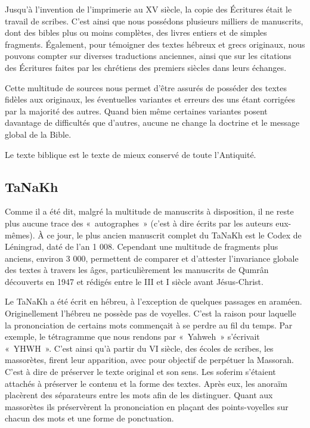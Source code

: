 \begin{small}
Jusqu'à l'invention de l'imprimerie au XV siècle, la copie des Écritures était le travail de scribes. C'est ainsi que nous possédons plusieurs milliers de manuscrits, dont des bibles plus ou moins complètes, des livres entiers et de simples fragments. Également, pour témoigner des textes hébreux et grecs originaux, nous pouvons compter sur diverses traductions anciennes, ainsi que sur les citations des Écritures faites par les chrétiens des premiers siècles dans leurs échanges.\bigskip

Cette multitude de sources nous permet d'être assurés de posséder des textes fidèles aux originaux, les éventuelles variantes et erreurs des uns étant corrigées par la majorité des autres. Quand bien même certaines variantes posent davantage de difficultés que d'autres, aucune ne change la doctrine et le message global de la Bible.\bigskip

Le texte biblique est le texte de mieux conservé de toute l'Antiquité.

\subsection*{TaNaKh}

Comme il a été dit, malgré la multitude de manuscrits à disposition, il ne reste plus aucune trace des «~autographes~» (c'est à dire écrits par les auteurs eux-mêmes). À ce jour, le plus ancien manuscrit complet du TaNaKh est le Codex de Léningrad, daté de l'an 1 008. Cependant une multitude de fragments plus anciens, environ 3 000, permettent de comparer et d'attester l'invariance globale des textes à travers les âges, particulièrement les manuscrits de Qumrân découverts en 1947 et rédigés entre le III et I siècle avant Jésus-Christ.\bigskip

Le TaNaKh a été écrit en hébreu, à l'exception de quelques passages en araméen. Originellement l'hébreu ne possède pas de voyelles. C'est la raison pour laquelle la prononciation de certains mots commençait à se perdre au fil du temps. Par exemple, le tétragramme que nous rendons par «~Yahweh~» s'écrivait «~YHWH~». C'est ainsi qu'à partir du VI siècle, des écoles de scribes, les massorètes, firent leur apparition, avec pour objectif de perpétuer la Massorah. C'est à dire de préserver le texte original et son sens. Les soferim s'étaient attachés à préserver le contenu et la forme des textes. Après eux, les anoraïm placèrent des séparateurs entre les mots afin de les distinguer. Quant aux massorètes ils préservèrent la prononciation en plaçant des points-voyelles sur chacun des mots et une forme de ponctuation.\bigskip


\end{small}
